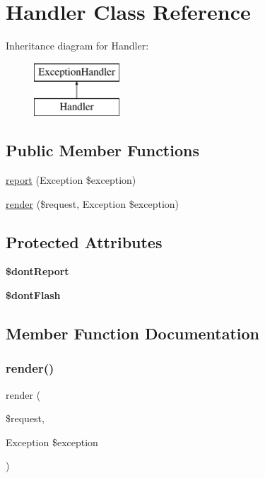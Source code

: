 \hypertarget{class_app_1_1_exceptions_1_1_handler}{}\section{Handler Class Reference}
\label{class_app_1_1_exceptions_1_1_handler}
Inheritance diagram for Handler\+:\begin{figure}[H]
\begin{center}
\leavevmode
\includegraphics[height=2.000000cm]{class_app_1_1_exceptions_1_1_handler}
\end{center}
\end{figure}
\subsection*{Public Member Functions}
\begin{DoxyCompactItemize}
\item 
\mbox{\hyperlink{class_app_1_1_exceptions_1_1_handler_a154e014b0d8b15cc04a646faded4a69f}{report}} (Exception \$exception)
\item 
\mbox{\hyperlink{class_app_1_1_exceptions_1_1_handler_af86680a7b1f9cf18e5d15e29e6a32dd8}{render}} (\$request, Exception \$exception)
\end{DoxyCompactItemize}
\subsection*{Protected Attributes}
\begin{DoxyCompactItemize}
\item 
{\bfseries \$dont\+Report}
\item 
{\bfseries \$dont\+Flash}
\end{DoxyCompactItemize}


\subsection{Member Function Documentation}
\mbox{\label{class_app_1_1_exceptions_1_1_handler_af86680a7b1f9cf18e5d15e29e6a32dd8}} 
\subsubsection{\texorpdfstring{render()}{render()}}
{\footnotesize\ttfamily render (\begin{DoxyParamCaption}\item[{}]{\$request,  }\item[{Exception}]{\$exception }\end{DoxyParamCaption})}

